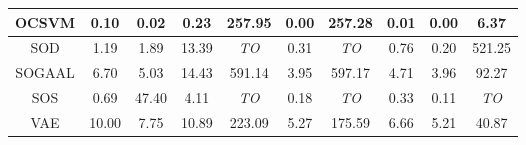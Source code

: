 \begin{table*}[!t]
\begin{tabular}{|c|c|c|c|c|c|c|c|c|c|}
\hline
                        OCSVM &                \textbf{0.10} &             \textbf{0.02} &                     0.23 &                  257.95 &           \textbf{0.00} &                 257.28 &                \textbf{0.01} &            \textbf{0.00} &                          6.37 \\
\hline
                        SOD &                         1.19 &                      1.89 &                    13.39 &             \textit{TO} &                    0.31 &            \textit{TO} &                         0.76 &                     0.20 &                        521.25 \\
\hline
                        SOGAAL &                         6.70 &                      5.03 &                    14.43 &                  591.14 &                    3.95 &                 597.17 &                         4.71 &                     3.96 &                         92.27 \\
\hline
                        SOS &                         0.69 &                     47.40 &                     4.11 &             \textit{TO} &                    0.18 &            \textit{TO} &                         0.33 &                     0.11 &                   \textit{TO} \\
\hline
                        VAE &                        10.00 &                      7.75 &                    10.89 &                  223.09 &                    5.27 &                 175.59 &                         6.66 &                     5.21 &                         40.87 \\
\hline
\end{tabular}
\end{table*}


